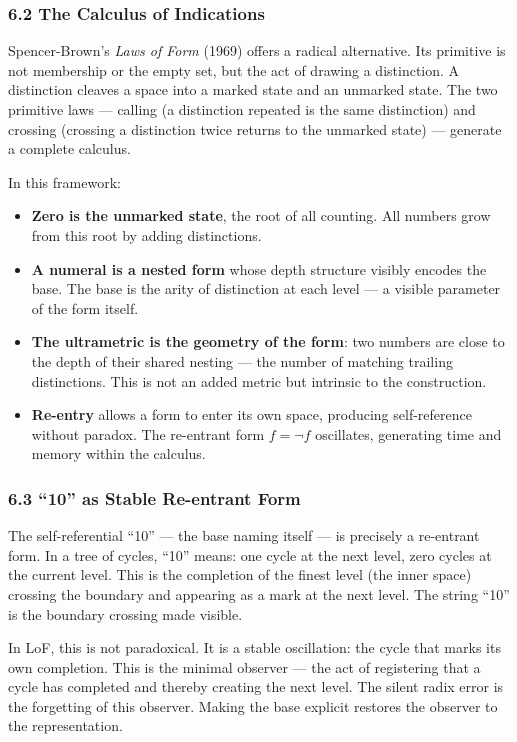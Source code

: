 \documentclass[
]{article}
\providecommand{\tightlist}{%
  \setlength{\itemsep}{0pt}\setlength{\parskip}{0pt}}
\begin{document}
\subsubsection{6.2 The Calculus of
Indications}\label{the-calculus-of-indications}

Spencer-Brown's \emph{Laws of Form} (1969) offers a radical alternative.
Its primitive is not membership or the empty set, but the act of drawing
a distinction. A distinction cleaves a space into a marked state and an
unmarked state. The two primitive laws --- calling (a distinction
repeated is the same distinction) and crossing (crossing a distinction
twice returns to the unmarked state) --- generate a complete calculus.

In this framework:

\begin{itemize}
\tightlist
\item
  \textbf{Zero is the unmarked state}, the root of all counting. All
  numbers grow from this root by adding distinctions.
\item
  \textbf{A numeral is a nested form} whose depth structure visibly
  encodes the base. The base is the arity of distinction at each level
  --- a visible parameter of the form itself.
\item
  \textbf{The ultrametric is the geometry of the form}: two numbers are
  close to the depth of their shared nesting --- the number of matching
  trailing distinctions. This is not an added metric but intrinsic to
  the construction.
\item
  \textbf{Re-entry} allows a form to enter its own space, producing
  self-reference without paradox. The re-entrant form \(f = \neg f\)
  oscillates, generating time and memory within the calculus.
\end{itemize}

\subsubsection{6.3 ``10'' as Stable Re-entrant
Form}\label{as-stable-re-entrant-form}

The self-referential ``10'' --- the base naming itself --- is precisely
a re-entrant form. In a tree of cycles, ``10'' means: one cycle at the
next level, zero cycles at the current level. This is the completion of
the finest level (the inner space) crossing the boundary and appearing
as a mark at the next level. The string ``10'' is the boundary crossing
made visible.

In LoF, this is not paradoxical. It is a stable oscillation: the cycle
that marks its own completion. This is the minimal observer --- the act
of registering that a cycle has completed and thereby creating the next
level. The silent radix error is the forgetting of this observer. Making
the base explicit restores the observer to the representation.
\end{document}
